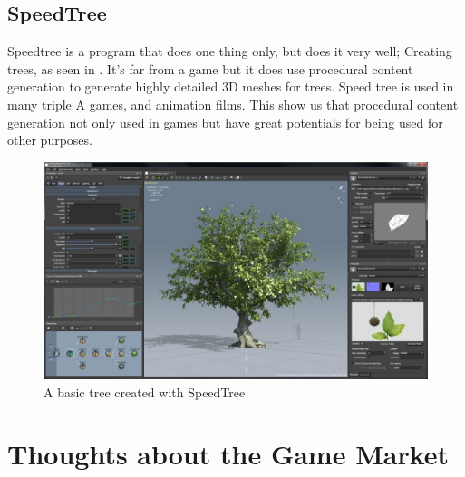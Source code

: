 \subsection{SpeedTree}

Speedtree\cite{SpeedTree} is a program that does one thing only, but does it very well; Creating trees, as seen in . It's far from a game but it does use procedural content generation to generate highly detailed 3D meshes for trees. Speed tree is used in many triple A games, and animation films. This show us that procedural content generation not only used in games but have great potentials for being used for other purposes.


\begin{figure}[H]
	\includegraphics[width=0.7\linewidth]{img/SpeedTree}
	\centering
	\caption{A basic tree created with SpeedTree}
	\label{fig:SpeedTree}
\end{figure}

\section{Thoughts about the Game Market}